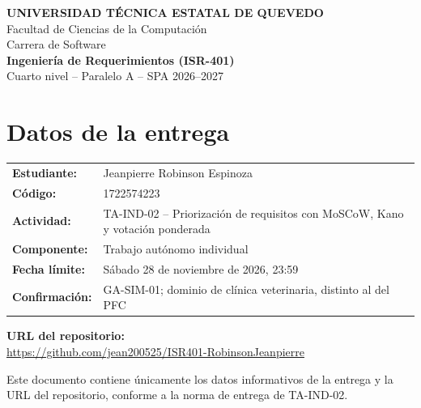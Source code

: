 \documentclass[12pt,a4paper]{article}
\begin{document}
\begin{center}
  {\large\bfseries UNIVERSIDAD TÉCNICA ESTATAL DE QUEVEDO}\\[4pt]
  Facultad de Ciencias de la Computación\\
  Carrera de Software\\[10pt]
  {\large\bfseries Ingeniería de Requerimientos (ISR-401)}\\[4pt]
  Cuarto nivel -- Paralelo A -- SPA 2026--2027
\end{center}

\vspace{1cm}

\section*{Datos de la entrega}

\begin{tabular}{@{}p{4.5cm}p{10cm}@{}}
  \textbf{Estudiante:}   & Jeanpierre Robinson Espinoza \\[6pt]
  \textbf{Código:}       & 1722574223 \\[6pt]
  \textbf{Actividad:}    & TA-IND-02 -- Priorización de requisitos con
                            MoSCoW, Kano y votación ponderada \\[6pt]
  \textbf{Componente:}   & Trabajo autónomo individual \\[6pt]
  \textbf{Fecha límite:} & Sábado 28 de noviembre de 2026, 23:59 \\[6pt]
  \textbf{Confirmación:} & GA-SIM-01; dominio de clínica veterinaria,
                            distinto al del PFC \\
\end{tabular}

\vspace{0.8cm}

\noindent\textbf{URL del repositorio:}\\[4pt]
\noindent\mbox{\url{https://github.com/jean200525/ISR401-RobinsonJeanpierre}}

\vspace{1cm}

\noindent\small
Este documento contiene únicamente los datos informativos de la entrega y la
URL del repositorio, conforme a la norma de entrega de TA-IND-02.
\end{document}
